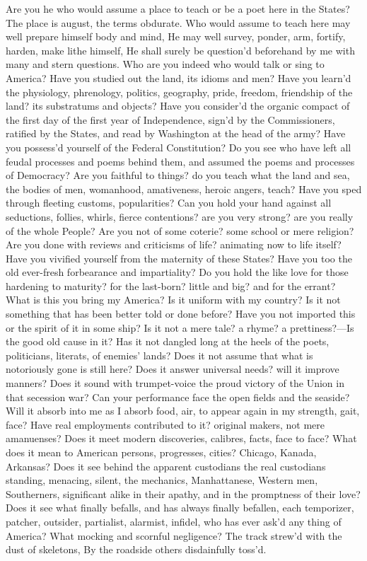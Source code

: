 \documentclass[11pt]{book}
\newenvironment {poem} [1]
 {\titulus{#1}%
  \versus
  \Nstanza{0}%
  \numerus{1}}
 {\endversus}
\begin{document}
\begin{poem}{By Blue Ontario's Shore}
Are you he who would assume a place to teach or be a poet here in %
    the States?
The place is august, the terms obdurate.
     \vacua
Who would assume to teach here may well prepare himself body and mind,
He may well survey, ponder, arm, fortify, harden, make lithe himself,
He shall surely be question'd beforehand by me with many and stern questions.
     \vacua
Who are you indeed who would talk or sing to America?
Have you studied out the land, its idioms and men?
Have you learn'd the physiology, phrenology, politics, ge\-og\-ra\-phy, %
    pride, freedom, friendship of the land? its sub\-stra\-tums and objects?
Have you consider'd the organic compact of the first day of the %
    first year of Independence, sign'd by the Commissioners, ratified %
    by the States, and read by Washington at the head of the army?
Have you possess'd yourself of the Federal Constitution?
Do you see who have left all feudal processes and poems behind them, %
    and assumed the poems and processes of Democracy?
Are you faithful to things? do you teach what the land and sea, the %
    bodies of men, womanhood, amativeness, heroic angers, teach?
Have you sped through fleeting customs, popularities?
Can you hold your hand against all seductions, follies, whirls, %
    fierce contentions? are you very strong? are you really of the %
    whole People?
Are you not of some coterie? some school or mere religion?
Are you done with reviews and criticisms of life? animating now to %
    life itself?
Have you vivified yourself from the maternity of these States?
Have you too the old ever-fresh forbearance and impartiality?
Do you hold the like love for those hardening to maturity? for the %
    last-born? little and big? and for the errant?
     \Vacua
What is this you bring my America?
Is it uniform with my country?
Is it not something that has been better told or done before?
Have you not imported this or the spirit of it in some ship?
Is it not a mere tale? a rhyme? a prettiness?---Is the good old cause in it?
Has it not dangled long at the heels of the poets, politicians, %
    literats, of enemies' lands?
Does it not assume that what is notoriously gone is still here?
Does it answer universal needs? will it improve manners?
Does it sound with trumpet-voice the proud victory of the Union in %
    that secession war?
Can your performance face the open fields and the seaside?
Will it absorb into me as I absorb food, air, to appear again in my %
    strength, gait, face?
Have real employments contributed to it? original makers, not mere %
    amanuenses?
Does it meet modern discoveries, calibres, facts, face to face?
What does it mean to American persons, progresses, cities? Chicago, %
    Kanada, Arkansas?
Does it see behind the apparent cus\-to\-dians the real cus\-to\-dians %
    standing, menacing, silent, the mechanics, Man\-hat\-tan\-ese, Western %
    men, Southerners, significant alike in their apathy, and in the %
    promptness of their love?
Does it see what finally befalls, and has always finally be\-fal\-len, %
    each temporizer, patcher, outsider, partialist, a\-larm\-ist, %
    infidel, who has ever ask'd any thing of America?
What mocking and scornful negligence?
The track strew'd with the dust of skeletons,
By the roadside others disdainfully toss'd.


\end{poem}
\end{document}
